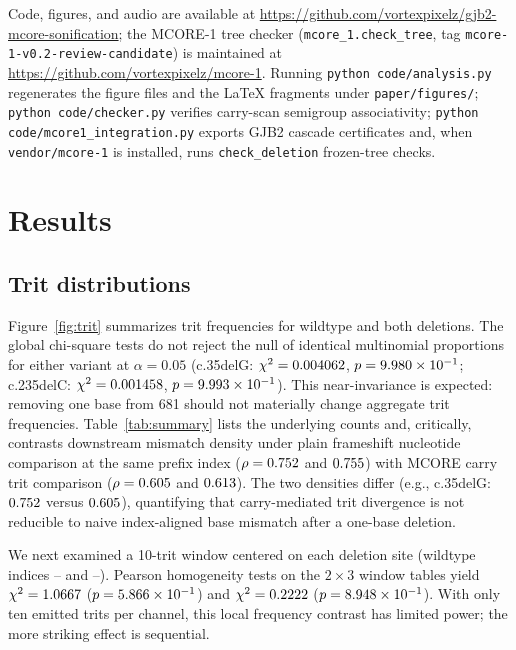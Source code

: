 \documentclass[preprint,12pt]{elsarticle}
\begin{document}
Code, figures, and audio are available at \url{https://github.com/vortexpixelz/gjb2-mcore-sonification}; the MCORE-1 tree checker (\texttt{mcore\_1.check\_tree}, tag \texttt{mcore-1-v0.2-review-candidate}) is maintained at \url{https://github.com/vortexpixelz/mcore-1}. Running \texttt{python code/analysis.py} regenerates the figure files and the LaTeX fragments under \texttt{paper/figures/}; \texttt{python code/checker.py} verifies carry-scan semigroup associativity; \texttt{python code/mcore1\_integration.py} exports GJB2 cascade certificates and, when \texttt{vendor/mcore-1} is installed, runs \texttt{check\_deletion} frozen-tree checks.

\section{Results}

\subsection{Trit distributions}

Figure~\ref{fig:trit} summarizes trit frequencies for wildtype and both deletions. The global chi-square tests do not reject the null of identical multinomial proportions for either variant at $\alpha=0.05$ (c.35delG: $\chi^2=0.004062$, $p=9.980 \times 10^{-1}$; c.235delC: $\chi^2=0.001458$, $p=9.993 \times 10^{-1}$). This near-invariance is expected: removing one base from 681 should not materially change aggregate trit frequencies. Table~\ref{tab:summary} lists the underlying counts and, critically, contrasts downstream mismatch density under plain frameshift nucleotide comparison at the same prefix index ($\rho=0.752$ and $0.755$) with MCORE carry trit comparison ($\rho=0.605$ and $0.613$). The two densities differ (e.g., c.35delG: $0.752$ versus $0.605$), quantifying that carry-mediated trit divergence is not reducible to naive index-aligned base mismatch after a one-base deletion.

We next examined a 10-trit window centered on each deletion site (wildtype indices \WinLoCThirtyFive--\WinHiCThirtyFive{} and \WinLoCTwoThirtyFive--\WinHiCTwoThirtyFive). Pearson homogeneity tests on the $2\times 3$ window tables yield $\chi^2=1.0667$ ($p=5.866 \times 10^{-1}$) and $\chi^2=0.2222$ ($p=8.948 \times 10^{-1}$). With only ten emitted trits per channel, this local frequency contrast has limited power; the more striking effect is sequential.
\end{document}
